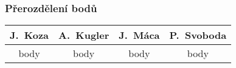 \documentclass{beamer}
\begin{document}
\begin{frame}[allowframebreaks]\frametitle{Přerozdělení bodů}
    
    \begin{center}
  \begin{tabular}{| c | c | c | c |}
    \hline
     J.~Koza & A.~Kugler & J.~Máca & P.~Svoboda \\
    \hline
     body & body & body & body \\
    \hline
  \end{tabular}     
   \end{center}
\end{frame}
\end{document}
